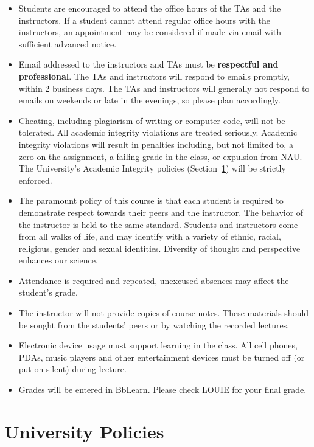\documentclass[
  letterpaper,
  DIV=11,
  numbers=noendperiod]{scrreprt}
\providecommand{\tightlist}{%
  \setlength{\itemsep}{0pt}\setlength{\parskip}{0pt}}\usepackage{longtable,booktabs,array}
\begin{document}
\begin{itemize}
\tightlist
\item
  Students are encouraged to attend the office hours of the TAs and the
  instructors. If a student cannot attend regular office hours with the
  instructors, an appointment may be considered if made via email with
  sufficient advanced notice.
\item
  Email addressed to the instructors and TAs must be \textbf{respectful
  and professional}. The TAs and instructors will respond to emails
  promptly, within 2 business days. The TAs and instructors will
  generally not respond to emails on weekends or late in the evenings,
  so please plan accordingly.
\item
  Cheating, including plagiarism of writing or computer code, will not
  be tolerated. All academic integrity violations are treated seriously.
  Academic integrity violations will result in penalties including, but
  not limited to, a zero on the assignment, a failing grade in the
  class, or expulsion from NAU. The University's Academic Integrity
  policies (Section~\ref{sec-univ-policy}) will be strictly enforced.
\item
  The paramount policy of this course is that each student is required
  to demonstrate respect towards their peers and the instructor. The
  behavior of the instructor is held to the same standard. Students and
  instructors come from all walks of life, and may identify with a
  variety of ethnic, racial, religious, gender and sexual identities.
  Diversity of thought and perspective enhances our science.
\item
  Attendance is required and repeated, unexcused absences may affect the
  student's grade.
\item
  The instructor will not provide copies of course notes. These
  materials should be sought from the students' peers or by watching the
  recorded lectures.
\item
  Electronic device usage must support learning in the class. All cell
  phones, PDAs, music players and other entertainment devices must be
  turned off (or put on silent) during lecture.
\item
  Grades will be entered in BbLearn. Please check LOUIE for your final
  grade.
\end{itemize}

\hypertarget{sec-univ-policy}{%
\section{University Policies}\label{sec-univ-policy}}
\end{document}
